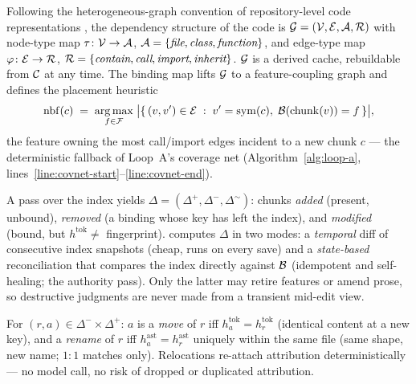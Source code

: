 \begin{definition}
\label{def:graph}
Following the heterogeneous-graph convention of repository-level code
representations \citep{locagent2025,graphcoder2024}, the dependency structure
of the code is $\mathcal{G} = (\mathcal{V}, \mathcal{E}, \mathcal{A}, \mathcal{R})$ with node-type map
$\tau \colon \mathcal{V} \to \mathcal{A}$, $\mathcal{A} = \{\textit{file}, \textit{class},
\textit{function}\}$, and edge-type map $\varphi \colon \mathcal{E} \to \mathcal{R}$,
$\mathcal{R} = \{\textit{contain}, \textit{call}, \textit{import}, \textit{inherit}\}$.
$\mathcal{G}$ is a derived cache, rebuildable from $\mathcal{C}$ at any time. The binding map
lifts $\mathcal{G}$ to a feature-coupling graph and defines the placement heuristic
\begin{equation}
\label{eq:neighbor}
\mathrm{nbf}(c) \;=\; \operatorname*{arg\,max}_{f \in \mathcal{F}}\;
\bigl\lvert \{\, (v, v') \in \mathcal{E} \;:\; v' = \mathrm{sym}(c),\;
\mathcal{B}(\mathrm{chunk}(v)) = f \,\} \bigr\rvert ,
\end{equation}
the feature owning the most call/import edges incident to a new chunk $c$ ---
the deterministic fallback of Loop~A's coverage net
(Algorithm~\ref{alg:loop-a}, lines~\ref{line:covnet-start}--\ref{line:covnet-end}).
\end{definition}

\begin{definition}[Changeset]
\label{def:changeset}
A pass over the index yields $\Delta = (\Delta^{+}, \Delta^{-}, \Delta^{\sim})$:
chunks \emph{added} (present, unbound), \emph{removed} (a binding whose key has
left the index), and \emph{modified} (bound, but
$h^{\mathrm{tok}} \neq$ fingerprint). \codoc{} computes $\Delta$ in two modes:
a \emph{temporal} diff of consecutive index snapshots (cheap, runs on every
save) and a \emph{state-based} reconciliation that compares the index directly
against $\mathcal{B}$ (idempotent and self-healing; the authority pass). Only the latter
may retire features or amend prose, so destructive judgments are never made
from a transient mid-edit view.
\end{definition}

\begin{definition}[Relocation]
\label{def:reloc}
For $(r, a) \in \Delta^{-} \times \Delta^{+}$: $a$ is a \emph{move} of $r$ iff
$h^{\mathrm{tok}}_a = h^{\mathrm{tok}}_r$ (identical content at a new key), and
a \emph{rename} of $r$ iff $h^{\mathrm{ast}}_a = h^{\mathrm{ast}}_r$ uniquely
within the same file (same shape, new name; $1{:}1$ matches only). Relocations
re-attach attribution deterministically --- no model call, no risk of dropped
or duplicated attribution.
\end{definition}

